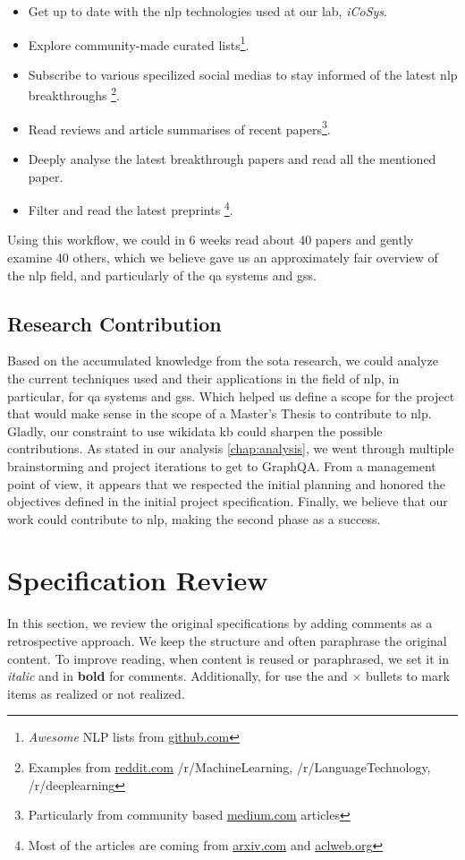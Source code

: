 \begin{itemize}
    \setlength\itemsep{0em}
    \item Get up to date with the \gls{nlp} technologies used at our lab, \textit{iCoSys}.
    \item Explore community-made curated lists\footnote{\textit{Awesome} NLP lists from \url{github.com}}.
    \item Subscribe to various specilized social medias to stay informed of the latest \gls{nlp} breakthroughs \footnote{Examples from \url{reddit.com} /r/MachineLearning, /r/LanguageTechnology, /r/deeplearning}.
    \item Read reviews and article summarises of recent papers\footnote{Particularly from community based \url{medium.com} articles}.
    \item Deeply analyse the latest breakthrough papers and read all the mentioned paper.
    \item Filter and read the latest preprints \footnote{Most of the articles are coming from \url{arxiv.com} and \url{aclweb.org}}.
\end{itemize}

Using this workflow, we could in 6 weeks read about 40 papers and gently examine 40 others, which we believe gave us an approximately fair overview of the \gls{nlp} field, and particularly of the \gls{qa} systems and \glspl{gs}.

\subsection{Research Contribution}
Based on the accumulated knowledge from the \gls{sota} research, we could analyze the current techniques used and their applications in the field of \gls{nlp}, in particular, for \gls{qa} systems and \glspl{gs}. Which helped us define a scope for the project that would make sense in the scope of a Master's Thesis to contribute to \gls{nlp}. Gladly, our constraint to use \gls{wikidata} \gls{kb} could sharpen the possible contributions. As stated in our analysis \ref{chap:analysis}, we went through multiple brainstorming and project iterations to get to GraphQA. From a management point of view, it appears that we respected the initial planning and honored the objectives defined in the initial project specification. Finally, we believe that our work could contribute to \gls{nlp}, making the second phase as a success. 


\section{Specification Review}
In this section, we review the original specifications by adding comments as a retrospective approach. We keep the structure and often paraphrase the original content. To improve reading, when content is reused or paraphrased, we set it in \textit{italic} and in \textbf{bold} for comments. Additionally, for use the \checkmark and $\times$ bullets to mark items as realized or not realized.

